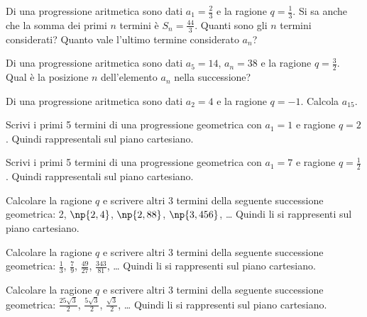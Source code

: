 \begin{esercizio}
\label{ese:8a_progr.19}
Di una progressione aritmetica sono dati $a_1=\frac{2}{3}$ e la ragione $q=\frac{1}{3}$. Si sa anche che la somma dei primi $n$ termini è $S_n=\frac{44}{3}$. Quanti sono gli $n$ termini considerati? Quanto vale l'ultimo termine considerato $a_n$?
\end{esercizio}

\begin{esercizio}
\label{ese:8a_progr.20}
Di una progressione aritmetica sono dati $a_5=14$, $a_n=38$ e la ragione $q=\frac{3}{2}$. Qual è la posizione $n$ dell'elemento $a_n$ nella successione?
\end{esercizio}

\begin{esercizio}
\label{ese:8a_progr.21}
Di una progressione aritmetica sono dati $a_2=4$ e la ragione $q=-1$. Calcola $a_{15}$.
\end{esercizio}

\begin{esercizio}
\label{ese:8a_progr.22}
Scrivi i primi 5 termini di una progressione geometrica con $a_1=1$ e ragione $q=2$. Quindi rappresentali sul piano cartesiano.
\end{esercizio}

\begin{esercizio}
\label{ese:8a_progr.23}
Scrivi i primi 5 termini di una progressione geometrica con $a_1=7$ e ragione $q=\frac{1}{2}$. Quindi rappresentali sul piano cartesiano.
\end{esercizio}

\begin{esercizio}
\label{ese:8a_progr.24}
Calcolare la ragione $q$ e scrivere altri 3 termini della seguente successione geometrica: 2, $\np{2,4}$, $\np{2,88}$, $\np{3,456}$, \ldots{} Quindi li si rappresenti sul piano cartesiano.
\end{esercizio}

\begin{esercizio}
\label{ese:8a_progr.25}
Calcolare la ragione $q$ e scrivere altri 3 termini della seguente successione geometrica: $\frac{1}{3}$, $\frac{7}{9}$, $\frac{49}{27}$, $\frac{343}{81}$, \ldots{} Quindi li si rappresenti sul piano cartesiano.
\end{esercizio}

\begin{esercizio}
\label{ese:8a_progr.26}
Calcolare la ragione $q$ e scrivere altri 3 termini della seguente successione geometrica: $\frac{25\sqrt{3}}{2}$, $\frac{5\sqrt{3}}{2}$, $\frac{\sqrt{3}}{2}$, \ldots{} Quindi li si rappresenti sul piano cartesiano.
\end{esercizio}

